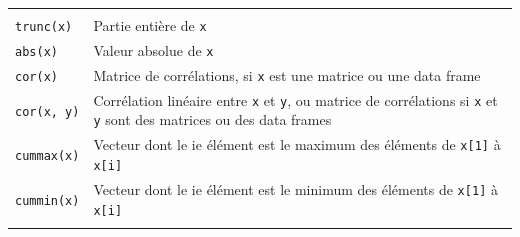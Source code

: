 \documentclass[
  11pt,
]{book}
\numberwithin{equation}{section}
\numberwithin{countremarque}{section}
\begin{document}
\begin{longtable}[]{@{}ll@{}}
\begin{minipage}[t]{0.53\columnwidth}
\end{minipage}\tabularnewline
\begin{minipage}[t]{0.41\columnwidth}\raggedright
\texttt{trunc(x)}\strut
\end{minipage} & \begin{minipage}[t]{0.53\columnwidth}\raggedright
Partie entière de \texttt{x}\strut
\end{minipage}\tabularnewline
\begin{minipage}[t]{0.41\columnwidth}\raggedright
\texttt{abs(x)}\strut
\end{minipage} & \begin{minipage}[t]{0.53\columnwidth}\raggedright
Valeur absolue de \texttt{x}\strut
\end{minipage}\tabularnewline
\begin{minipage}[t]{0.41\columnwidth}\raggedright
\texttt{cor(x)}\strut
\end{minipage} & \begin{minipage}[t]{0.53\columnwidth}\raggedright
Matrice de corrélations, si \texttt{x} est une matrice ou une data frame\strut
\end{minipage}\tabularnewline
\begin{minipage}[t]{0.41\columnwidth}\raggedright
\texttt{cor(x,\ y)}\strut
\end{minipage} & \begin{minipage}[t]{0.53\columnwidth}\raggedright
Corrélation linéaire entre \texttt{x} et \texttt{y}, ou matrice de corrélations si \texttt{x} et \texttt{y} sont des matrices ou des data frames\strut
\end{minipage}\tabularnewline
\begin{minipage}[t]{0.41\columnwidth}\raggedright
\texttt{cummax(x)}\strut
\end{minipage} & \begin{minipage}[t]{0.53\columnwidth}\raggedright
Vecteur dont le ie élément est le maximum des éléments de \texttt{x{[}1{]}} à \texttt{x{[}i{]}}\strut
\end{minipage}\tabularnewline
\begin{minipage}[t]{0.41\columnwidth}\raggedright
\texttt{cummin(x)}\strut
\end{minipage} & \begin{minipage}[t]{0.53\columnwidth}\raggedright
Vecteur dont le ie élément est le minimum des éléments de \texttt{x{[}1{]}} à \texttt{x{[}i{]}}\strut
\end{minipage}\tabularnewline
\begin{minipage}[t]{0.41\columnwidth}\raggedright

\end{minipage}
\end{longtable}
\end{document}
